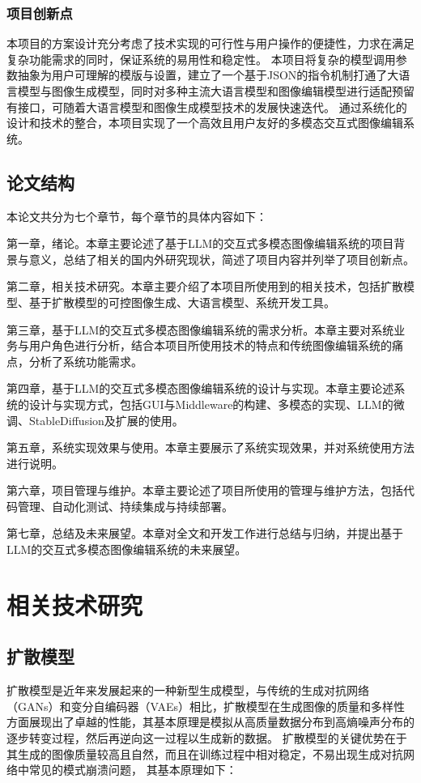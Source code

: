\documentclass[a4paper,AutoFakeBold,oneside,12pt]{book}
\begin{document}
\subsection{项目创新点}
本项目的方案设计充分考虑了技术实现的可行性与用户操作的便捷性，力求在满足复杂功能需求的同时，保证系统的易用性和稳定性。
本项目将复杂的模型调用参数抽象为用户可理解的模版与设置，建立了一个基于JSON的指令机制打通了大语言模型与图像生成模型，同时对多种主流大语言模型和图像编辑模型进行适配预留有接口，可随着大语言模型和图像生成模型技术的发展快速迭代。
通过系统化的设计和技术的整合，本项目实现了一个高效且用户友好的多模态交互式图像编辑系统。

\section{论文结构}
本论文共分为七个章节，每个章节的具体内容如下：

第一章，绪论。本章主要论述了基于LLM的交互式多模态图像编辑系统的项目背景与意义，总结了相关的国内外研究现状，简述了项目内容并列举了项目创新点。

第二章，相关技术研究。本章主要介绍了本项目所使用到的相关技术，包括扩散模型、基于扩散模型的可控图像生成、大语言模型、系统开发工具。

第三章，基于LLM的交互式多模态图像编辑系统的需求分析。本章主要对系统业务与用户角色进行分析，结合本项目所使用技术的特点和传统图像编辑系统的痛点，分析了系统功能需求。

第四章，基于LLM的交互式多模态图像编辑系统的设计与实现。本章主要论述系统的设计与实现方式，包括GUI与Middleware的构建、多模态的实现、LLM的微调、StableDiffusion及扩展的使用。

第五章，系统实现效果与使用。本章主要展示了系统实现效果，并对系统使用方法进行说明。

第六章，项目管理与维护。本章主要论述了项目所使用的管理与维护方法，包括代码管理、自动化测试、持续集成与持续部署。

第七章，总结及未来展望。本章对全文和开发工作进行总结与归纳，并提出基于LLM的交互式多模态图像编辑系统的未来展望。

\chapter{相关技术研究}
\section{扩散模型}
扩散模型是近年来发展起来的一种新型生成模型，与传统的生成对抗网络（GANs）和变分自编码器（VAEs）相比，扩散模型在生成图像的质量和多样性方面展现出了卓越的性能，其基本原理是模拟从高质量数据分布到高熵噪声分布的逐步转变过程，然后再逆向这一过程以生成新的数据。
扩散模型的关键优势在于其生成的图像质量较高且自然，而且在训练过程中相对稳定，不易出现生成对抗网络中常见的模式崩溃问题，
其基本原理如下：
\end{document}
